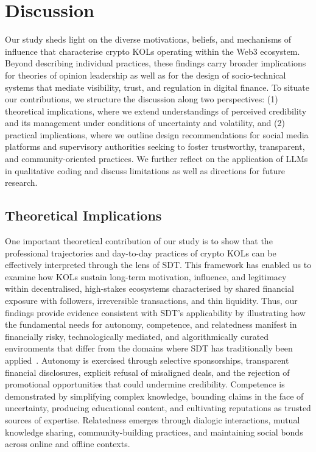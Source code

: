 
\section{Discussion}\label{sec:discussion}

Our study sheds light on the diverse motivations, beliefs, and mechanisms of influence that characterise crypto KOLs operating within the Web3 ecosystem. Beyond describing  individual practices, these findings carry broader implications for theories of opinion leadership as well as for the design of socio-technical systems that mediate visibility, trust, and regulation in digital finance. To situate our contributions, we structure the discussion along two perspectives: (1) theoretical implications, where we extend understandings of perceived credibility and its management under conditions of uncertainty and volatility, and (2) practical implications, where we outline design recommendations for social media platforms and supervisory authorities seeking to foster trustworthy, transparent, and community-oriented practices. We further reflect on the application of LLMs in qualitative coding and discuss limitations as well as directions for future research.

\subsection{Theoretical Implications}

One important theoretical contribution of our study is to show that the professional trajectories and day-to-day practices of crypto KOLs can be effectively interpreted through the lens of SDT. This framework has enabled us to examine how KOLs sustain long-term motivation, influence, and legitimacy within decentralised, high-stakes ecosystems characterised by shared financial exposure with followers, irreversible transactions, and thin liquidity. Thus, our findings provide evidence consistent with SDT's applicability by illustrating how the fundamental needs for autonomy, competence, and relatedness manifest in financially risky, technologically mediated, and algorithmically curated environments that differ from the domains where SDT has traditionally been applied~\cite{olafsen2025crafting,sharifi2024basic,beierlein2025creating}. Autonomy is exercised through selective sponsorships, transparent financial disclosures, explicit refusal of misaligned deals, and the rejection of promotional opportunities that could undermine credibility. Competence is demonstrated by simplifying complex knowledge, bounding claims in the face of uncertainty, producing educational content, and cultivating reputations as trusted sources of expertise. Relatedness emerges through dialogic interactions, mutual knowledge sharing, community-building practices, and maintaining social bonds across online and offline contexts.

